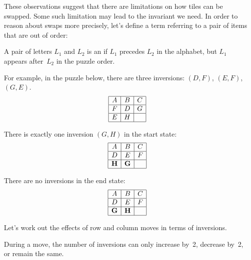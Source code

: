 These observations suggest that there are limitations on how tiles can
be swapped.  Some such limitation may lead to the invariant we need.
In order to reason about swaps more precisely, let's define a term
referring to a pair of items that are out of order:
\begin{definition}\label{def:8inversion}
A pair of letters $L_1$ and $L_2$ is an  if $L_1$
precedes $L_2$ in the alphabet, but $L_1$ appears after~$L_2$ in the
puzzle order.
\end{definition}

For example, in the puzzle below, there are three inversions: $(D,
F)$, $(E, F)$, $(G, E)$.
\begin{equation*}
\begin{array}{|c|c|c|}
\hline
A & B & C \\ \hline
F & D & G \\ \hline
E & H &   \\ \hline
\end{array}
\end{equation*}

There is exactly one inversion $(G, H)$ in the start state:
\begin{equation*}
\begin{array}{|c|c|c|}
\hline
A & B & C \\ \hline
D & E & F \\ \hline
\mathbf{H} & \mathbf{G} &   \\ \hline
\end{array}
\end{equation*}

There are no inversions in the end state:
\begin{equation*}
\begin{array}{|c|c|c|}
\hline
A & B & C \\ \hline
D & E & F \\ \hline
\mathbf{G} & \mathbf{H} &   \\ \hline
\end{array}
\end{equation*}

Let's work out the effects of row and column moves in terms of
inversions.

\begin{lemma}\label{lem:8puzzleC}
During a move, the number of inversions can only increase by~2,
decrease by~2, or remain the same.
\end{lemma}


